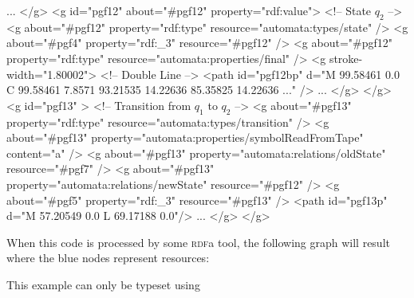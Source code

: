 \begin{codeexample}[multipage]
    ...
  </g>
  <g id="pgf12"  about="#pgf12" property="rdf:value">
    <!-- State $q_2$ -->
    <g about="#pgf12" property="rdf:type" resource="automata:types/state" />
    <g about="#pgf4" property="rdf:_3" resource="#pgf12" />
    <g about="#pgf12" property="rdf:type" resource="automata:properties/final" />
    <g stroke-width="1.80002">     <!-- Double Line -->
      <path id="pgf12bp" d="M 99.58461 0.0 C 99.58461 7.8571 93.21535 14.22636 85.35825 14.22636 ..." />
      ...
    </g>
  </g>
  <g id="pgf13" >
    <!-- Transition from $q_1$ to $q_2$ -->
    <g about="#pgf13" property="rdf:type" resource="automata:types/transition" />
    <g about="#pgf13" property="automata:properties/symbolReadFromTape" content="a" />
    <g about="#pgf13" property="automata:relations/oldState" resource="#pgf7" />
    <g about="#pgf13" property="automata:relations/newState" resource="#pgf12" />
    <g about="#pgf5" property="rdf:_3" resource="#pgf13" />
    <path id="pgf13p" d="M 57.20549 0.0 L 69.17188 0.0"/>
    ...
  </g>
</g>
\end{codeexample}

When this code is processed by some \textsc{rdf}a tool, the following graph
will result where the blue nodes represent resources:

\ifluatex
\else
    This example can only be typeset using 
    \endgroup\expandafter\endinput
\fi

